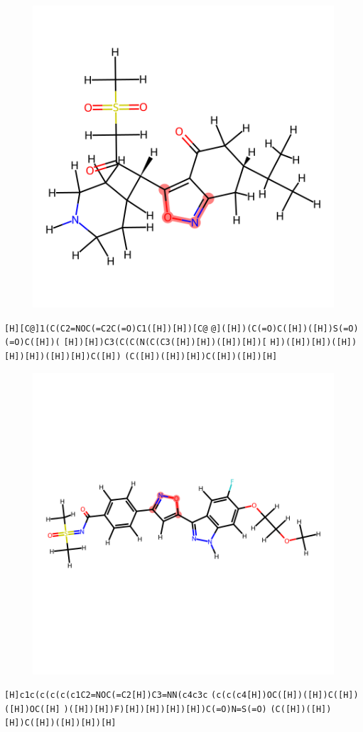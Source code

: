 \documentclass{article}
\begin{document}
\begin{figure}[ht]
\centering
    \includegraphics{mol56.png}
\end{figure}
\verb|[H][C@]1(C(C2=NOC(=C2C(=O)C1([H])[H])[C@| \verb|@]([H])(C(=O)C([H])([H])S(=O)(=O)C([H])(| \verb|[H])[H])C3(C(C(N(C(C3([H])[H])([H])[H])[| \verb|H])([H])[H])([H])[H])[H])([H])[H])C([H])| \verb|(C([H])([H])[H])C([H])([H])[H]|

\begin{figure}[ht]
\centering
    \includegraphics{mol57.png}
\end{figure}
\verb|[H]c1c(c(c(c(c1C2=NOC(=C2[H])C3=NN(c4c3c| \verb|(c(c(c4[H])OC([H])([H])C([H])([H])OC([H]| \verb|)([H])[H])F)[H])[H])[H])[H])C(=O)N=S(=O)| \verb|(C([H])([H])[H])C([H])([H])[H])[H]|
\end{document}
